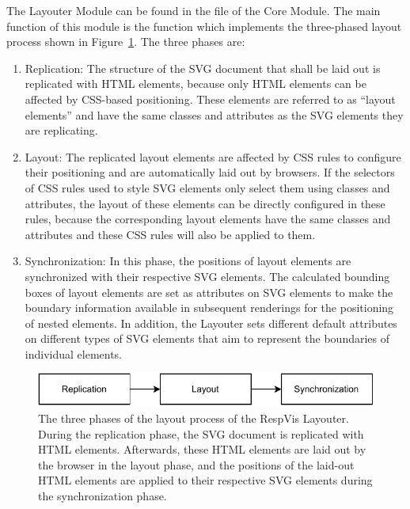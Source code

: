 The Layouter Module can be found in the  file of the
Core Module. The main function of this module is the
 function which implements the three-phased
layout process shown in Figure~\ref{fig:LayoutProcess}. The three
phases are:
\begin{enumerate}
\item Replication: The structure of the SVG document that shall be
  laid out is replicated with HTML  elements, because
  only HTML elements can be affected by CSS-based positioning. These
  elements are referred to as \enquote{layout elements} and have the
  same classes and  attributes as the SVG elements they
  are replicating.

\item Layout: The replicated layout elements are affected by CSS rules
  to configure their positioning and are automatically laid out by
  browsers. If the selectors of CSS rules used to style SVG elements
  only select them using classes and  attributes, the
  layout of these elements can be directly configured in these rules,
  because the corresponding layout elements have the same classes and
   attributes and these CSS rules will also be applied to
  them.

\item Synchronization: In this phase, the positions of layout elements
  are synchronized with their respective SVG elements. The calculated
  bounding boxes of layout elements are set as 
  attributes on SVG elements to make the boundary information
  available in subsequent renderings for the positioning of nested
  elements. In addition, the Layouter sets different default
  attributes on different types of SVG elements that aim to represent
  the boundaries of individual elements.
\end{enumerate}




\begin{figure}[tp]
\centering
\includegraphics[keepaspectratio,width=\linewidth,height=\fullh]
{diagrams/respvis-layout-process.pdf}
\caption[Layout Process of the Layouter]{
The three phases of the layout process of the RespVis Layouter.
During the replication phase, the SVG document is replicated with HTML
 elements. Afterwards, these HTML elements are laid out by
the browser in the layout phase, and the positions of the laid-out
HTML elements are applied to their respective SVG elements during the
synchronization phase.  
}
\label{fig:LayoutProcess}
\end{figure}



